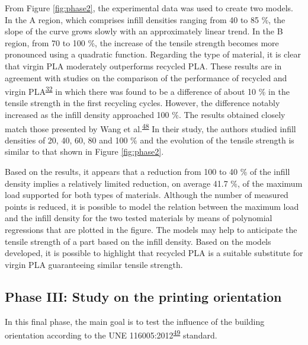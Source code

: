 \documentclass[
  12pt]{article}
\begin{document}
From Figure \ref{fig:phase2}, the experimental data was used to create two models.
In the A region, which comprises infill densities ranging from 40 to 85 \%, the slope of the curve grows slowly with an approximately linear trend.
In the B region, from 70 to 100 \%, the increase of the tensile strength becomes more pronounced using a quadratic function.
Regarding the type of material, it is clear that virgin PLA moderately outperforms recycled PLA.
These results are in agreement with studies on the comparison of the performance of recycled and virgin PLA\textsuperscript{\protect\hyperlink{ref-CruzSanchez2017}{32}} in which there was found to be a difference of about 10 \% in the tensile strength in the first recycling cycles.
However, the difference notably increased as the infill density approached 100 \%. The results obtained closely match those presented by Wang et al.\textsuperscript{\protect\hyperlink{ref-Wang2020h}{48}}
In their study, the authors studied infill densities of 20, 40, 60, 80 and 100 \% and the evolution of the tensile strength is similar to that shown in Figure \ref{fig:phase2}.

Based on the results, it appears that a reduction from 100 to 40 \% of the infill density implies a relatively limited reduction, on average 41.7 \%, of the maximum load supported for both types of materials.
Although the number of measured points is reduced, it is possible to model the relation between the maximum load and the infill density for the two tested materials by means of polynomial regressions that are plotted in the figure.
The models may help to anticipate the tensile strength of a part based on the infill density.
Based on the models developed, it is possible to highlight that recycled PLA is a suitable substitute for virgin PLA guaranteeing similar tensile strength.

\hypertarget{phase-iii-study-on-the-printing-orientation}{%
\subsection{Phase III: Study on the printing orientation}\label{phase-iii-study-on-the-printing-orientation}}

In this final phase, the main goal is to test the influence of the building orientation according to the UNE 116005:2012\textsuperscript{\protect\hyperlink{ref-Garcia-Dominguez2020}{49}} standard.
\end{document}
